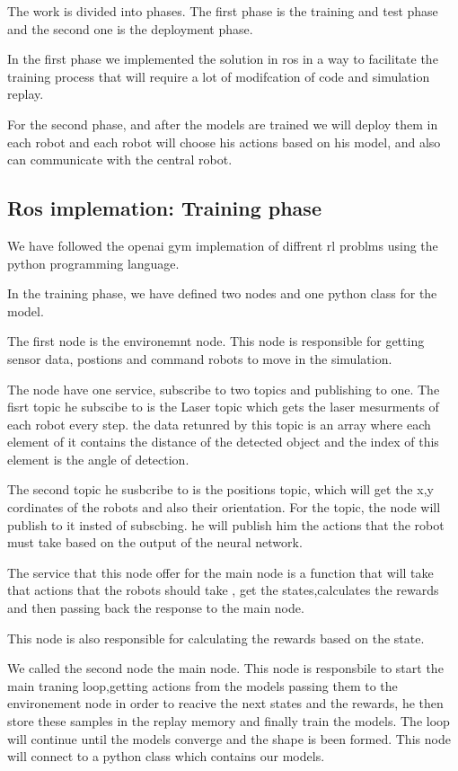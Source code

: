 \documentclass[12pt]{extarticle}
\begin{document}
The work is divided into phases. The first phase is the training and test phase and the second one is the deployment phase.

In the first phase we implemented the solution in ros in a way to facilitate the training process that will require a lot of modifcation of code and simulation replay.

For the second phase, and after the models are trained we will deploy them in each robot and each robot will choose his actions based on his model, and also can communicate with the central robot.

\subsection{Ros implemation: Training phase}


We have followed the openai gym implemation of diffrent rl problms using the python programming language.

In the training phase, we have defined two nodes and one python class for the model.
 

The first node is the environemnt node. This node is responsible for getting sensor data, postions and command robots to move in the simulation.

The node have one service, subscribe to  two topics and publishing to one. The fisrt topic he subscibe to is the Laser topic which gets the laser mesurments of each robot every step. the data retunred by this topic is an array where each element of it contains the distance of the detected object and the index of this element is the angle of detection.

The second topic he susbcribe to is the positions topic, which will get the x,y cordinates of the robots and also their orientation. For the topic, the node will publish to it insted of subscbing. he will publish him the actions that the robot must take based on the output of the neural network.

The service that this node offer for the main node is  a function that will take that actions that the robots should take , get the states,calculates the rewards and then passing back the response to the main node. 

This node is also responsible for calculating the rewards based on the state.

We called the second node the main node. This node is responsbile to start the main traning loop,getting actions from the models passing them to the environement node in order to reacive the next states and the rewards, he then store these samples in the replay memory and finally train the models.
The loop will continue until the models converge and the shape is been formed. This node will connect to a python class which contains our models.
\end{document}
